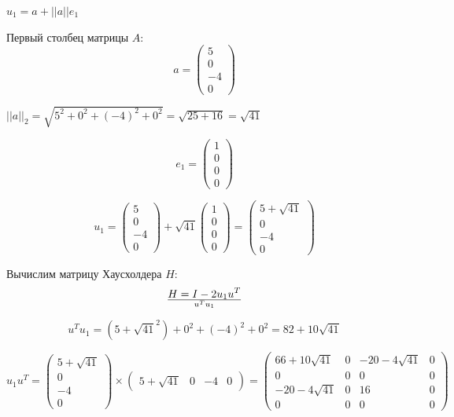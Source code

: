 \documentclass[a4paper,14pt]{article}
\begin{document}
$u_1 = a + ||a||e_1$

Первый столбец матрицы $A$:
$$
a = \begin{pmatrix}
5 \\
0 \\
-4 \\
0 
\end{pmatrix}
$$

$||a||_2 = \sqrt{5^2 + 0^2 + (-4)^2 + 0^2} = \sqrt{25+16} = \sqrt{41}$

$$
e_1 = \begin{pmatrix}
    1 \\
    0 \\
    0 \\
    0
\end{pmatrix}
$$

$$
u_1 = \begin{pmatrix}
        5 \\
        0 \\
        -4 \\
        0 
    \end{pmatrix}
    + 
    \sqrt{41}\begin{pmatrix}
        1 \\
        0 \\
        0 \\
        0
    \end{pmatrix}
    =
    \begin{pmatrix}
        5 + \sqrt{41} \\
        0 \\
        -4 \\
        0
    \end{pmatrix}
$$

Вычислим матрицу Хаусхолдера $H$:
$$
H = I - 2{u_1u^T}\over{u^Tu_1}
$$

$$
u^Tu_1 = (5 + \sqrt{41}^2) + 0^2 + (-4)^2 + 0^2 = 82 + 10\sqrt{41}
$$

$$
u_1u^T = \begin{pmatrix}
            5 + \sqrt{41} \\
            0 \\
            -4 \\
            0
        \end{pmatrix}
        \times
        \begin{pmatrix}
            5 + \sqrt{41} & 0 & -4 & 0
        \end{pmatrix}
        =
        \begin{pmatrix}
            66 + 10\sqrt{41} & 0 & -20 - 4\sqrt{41} & 0 \\
            0                & 0 & 0                & 0 \\
            -20 - 4\sqrt{41} & 0 & 16               & 0 \\
            0                & 0 & 0                & 0
        \end{pmatrix}
$$
\end{document}
